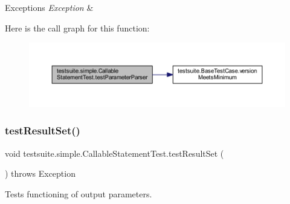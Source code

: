 \begin{DoxyExceptions}{Exceptions}
{\em Exception} & \\
\hline
\end{DoxyExceptions}
Here is the call graph for this function\+:
\nopagebreak
\begin{figure}[H]
\begin{center}
\leavevmode
\includegraphics[width=350pt]{classtestsuite_1_1simple_1_1_callable_statement_test_a0586bd82e4c828405b924bb8262f464c_cgraph}
\end{center}
\end{figure}
\mbox{\label{classtestsuite_1_1simple_1_1_callable_statement_test_a8007b7089823f54d85bc02cf1c5427e8}} 
\subsubsection{\texorpdfstring{test\+Result\+Set()}{testResultSet()}}
{\footnotesize\ttfamily void testsuite.\+simple.\+Callable\+Statement\+Test.\+test\+Result\+Set (\begin{DoxyParamCaption}{ }\end{DoxyParamCaption}) throws Exception}

Tests functioning of output parameters.


